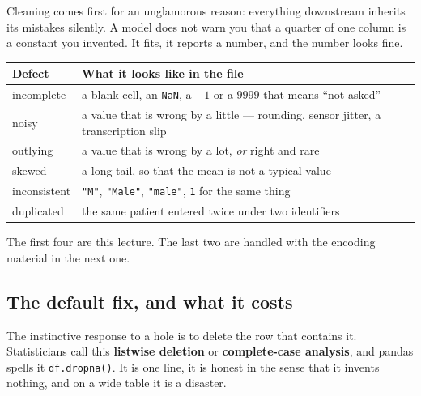 \documentclass[11pt]{article}
\begin{document}
Cleaning comes first for an unglamorous reason: everything downstream inherits
its mistakes silently. A model does not warn you that a quarter of one column
is a constant you invented. It fits, it reports a number, and the number looks
fine.

\begin{center}
\begin{tabular}{@{}lp{8.2cm}@{}}
\toprule
\textbf{Defect} & \textbf{What it looks like in the file}\\
\midrule
incomplete   & a blank cell, an \texttt{NaN}, a $-1$ or a $9999$ that means
               ``not asked''\\
noisy        & a value that is wrong by a little --- rounding, sensor jitter,
               a transcription slip\\
outlying     & a value that is wrong by a lot, \emph{or} right and rare\\
skewed       & a long tail, so that the mean is not a typical value\\
inconsistent & \texttt{"M"}, \texttt{"Male"}, \texttt{"male"}, \texttt{1} for
               the same thing\\
duplicated   & the same patient entered twice under two identifiers\\
\bottomrule
\end{tabular}
\end{center}

The first four are this lecture. The last two are handled with the encoding
material in the next one.

\subsection{The default fix, and what it costs}
\label{sec:listwise}

The instinctive response to a hole is to delete the row that contains it.
Statisticians call this \textbf{listwise deletion} or \textbf{complete-case
analysis}, and pandas spells it \texttt{df.dropna()}. It is one line, it is
honest in the sense that it invents nothing, and on a wide table it is a
disaster.
\end{document}
